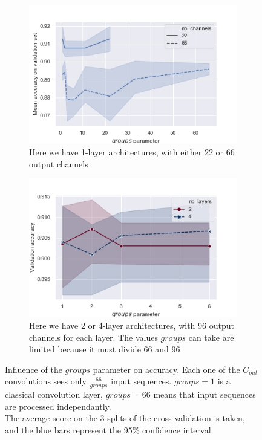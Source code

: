 \documentclass{article}
\begin{document}
\begin{figure}
    \centering
    \begin{subfigure}{0.45\linewidth}
        \includegraphics[width=\linewidth]{img/groups-param-nb-channels.jpg}
        \caption{Here we have 1-layer architectures, with either 22 or 66 output channels}
    \end{subfigure}
    \begin{subfigure}{0.45\linewidth}
        \includegraphics[width=\linewidth]{img/groups-param-nb-layers.jpg}
        \caption{Here we have 2 or 4-layer architectures, with 96 output channels for each layer. The values $groups$ can take are limited because it must divide 66 and 96}
    \end{subfigure}
    \caption{Influence of the $groups$ parameter on accuracy. Each one of the $C_{out}$ convolutions sees only $\frac{66}{groups}$ input sequences. $groups=1$ is a classical convolution layer, $groups=66$ means that input sequences are processed independantly. \\ The average score on the 3 splits of the cross-validation is taken, and the blue bars represent the 95\% confidence interval.}
    \label{fig:groups-parameter}
\end{figure}
\par
\end{document}
